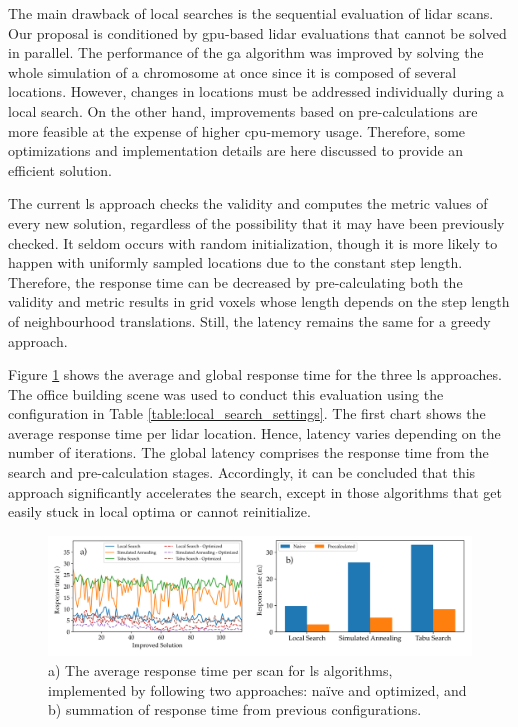 The main drawback of local searches is the sequential evaluation of \acrshort{lidar} scans. Our proposal is conditioned by \acrshort{gpu}-based \acrshort{lidar} evaluations that cannot be solved in parallel. The performance of the \acrshort{ga} algorithm was improved by solving the whole simulation of a chromosome at once since it is composed of several locations. However, changes in locations must be addressed individually during a local search. On the other hand, improvements based on pre-calculations are more feasible at the expense of higher \acrshort{cpu}-memory usage. Therefore, some optimizations and implementation details are here discussed to provide an efficient solution.

The current \acrshort{ls} approach checks the validity and computes the metric values of every new solution, regardless of the possibility that it may have been previously checked. It seldom occurs with random initialization, though it is more likely to happen with uniformly sampled locations due to the constant step length. Therefore, the response time can be decreased by pre-calculating both the validity and metric results in grid voxels whose length depends on the step length of neighbourhood translations. Still, the latency remains the same for a greedy approach. 

Figure \ref{fig:local_search_response_time} shows the average and global response time for the three \acrshort{ls} approaches. The office building scene was used to conduct this evaluation using the configuration in Table \ref{table:local_search_settings}. The first chart shows the average response time per \acrshort{lidar} location. Hence, latency varies depending on the number of iterations. The global latency comprises the response time from the search and pre-calculation stages. Accordingly, it can be concluded that this approach significantly accelerates the search, except in those algorithms that get easily stuck in local optima or cannot reinitialize. 

\begin{figure}
    \centering
    \includegraphics[width=\linewidth]{figs/lidar_optimization/response_time_results.png}
	\caption{a) The average response time per scan for \acrshort{ls} algorithms, implemented by following two approaches: naïve and optimized, and b) summation of response time from previous configurations. }
	\label{fig:local_search_response_time}
\end{figure}

